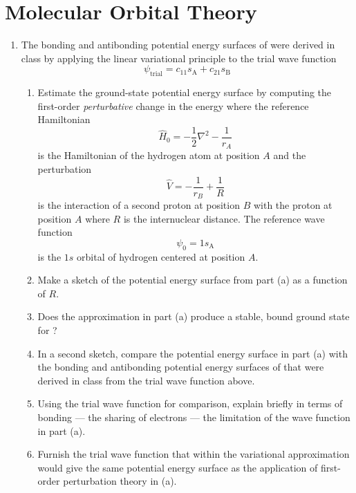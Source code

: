 \documentclass[../psets.tex]{subfiles}
\begin{document}
\section{Molecular Orbital Theory}
\begin{enumerate}
    \item {}The bonding and antibonding potential energy surfaces of  were derived in class by applying the linear variational principle to the trial wave function
    \begin{equation*}
        \psi_\text{trial} = c_11s_\text{A}+c_21s_\text{B}
    \end{equation*}
    \begin{enumerate}
        \item Estimate the ground-state potential energy surface by computing the first-order \emph{perturbative} change in the energy where the reference Hamiltonian
        \begin{equation*}
            \hat{H}_0 = -\frac{1}{2}\nabla^2-\frac{1}{r_A}
        \end{equation*}
        is the Hamiltonian of the hydrogen atom at position $A$ and the perturbation
        \begin{equation*}
            \hat{V} = -\frac{1}{r_B}+\frac{1}{R}
        \end{equation*}
        is the interaction of a second proton at position $B$ with the proton at position $A$ where $R$ is the internuclear distance. The reference wave function
        \begin{equation*}
            \psi_0 = 1s_\text{A}
        \end{equation*}
        is the $1s$ orbital of hydrogen centered at position $A$.
        \item Make a sketch of the potential energy surface from part (a) as a function of $R$.
        \item Does the approximation in part (a) produce a stable, bound ground state for ?
        \item In a second sketch, compare the potential energy surface in part (a) with the bonding and antibonding potential energy surfaces of  that were derived in class from the trial wave function above.
        \item Using the trial wave function for comparison, explain briefly in terms of bonding --- the sharing of electrons --- the limitation of the wave function in part (a).
        \item Furnish the trial wave function that within the variational approximation would give the same potential energy surface as the application of first-order perturbation theory in (a).

\end{enumerate}
\end{enumerate}
\end{document}
